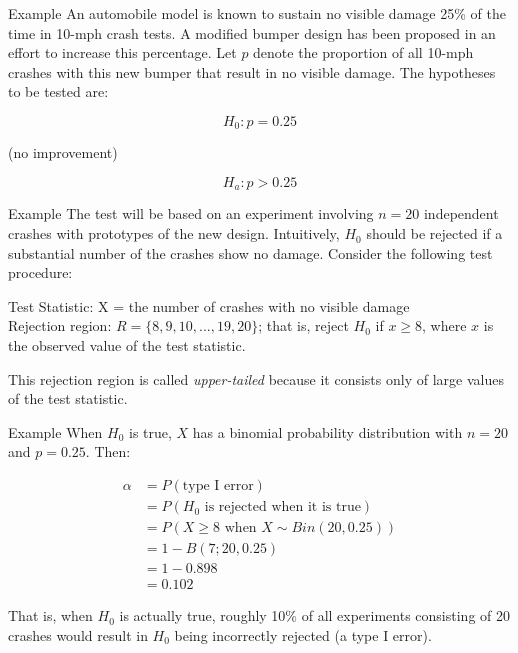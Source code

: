\documentclass[
  ignorenonframetext,
]{beamer}
\begin{document}
\begin{frame}{Example}
\protect\hypertarget{example-2}{}
An automobile model is known to sustain no visible damage 25\% of the
time in 10-mph crash tests. A modified bumper design has been proposed
in an effort to increase this percentage. Let \(p\) denote the
proportion of all 10-mph crashes with this new bumper that result in no
visible damage. The hypotheses to be tested are:

\[
H_{0}: p = 0.25
\]

(no improvement)

\[
H_{a}: p > 0.25
\]
\end{frame}

\begin{frame}{Example}
\protect\hypertarget{example-3}{}
The test will be based on an experiment involving \(n=20\) independent
crashes with prototypes of the new design. Intuitively, \(H_{0}\) should
be rejected if a substantial number of the crashes show no damage.
Consider the following test procedure:

Test Statistic: X = the number of crashes with no visible damage\\
Rejection region: \(R = \{8, 9, 10, ..., 19, 20 \}\); that is, reject
\(H_{0}\) if \(x \geq 8\), where \(x\) is the observed value of the test
statistic.

This rejection region is called \emph{upper-tailed} because it consists
only of large values of the test statistic.
\end{frame}

\begin{frame}{Example}
\protect\hypertarget{example-4}{}
When \(H_{0}\) is true, \(X\) has a binomial probability distribution
with \(n=20\) and \(p=0.25\). Then:

\[
\begin{aligned}
\alpha &= P(\text{type I error}) \\
&= P(H_{0} \text{ is rejected when it is true}) \\
&= P(X \geq 8 \text{ when } X \sim Bin(20,0.25)) \\
&= 1 - B(7; 20, 0.25)\\
&= 1 - 0.898 \\
&= 0.102 
\end{aligned}
\]

That is, when \(H_{0}\) is actually true, roughly 10\% of all
experiments consisting of 20 crashes would result in \(H_{0}\) being
incorrectly rejected (a type I error).
\end{frame}
\end{document}

